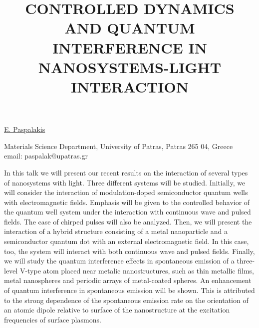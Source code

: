 \title{CONTROLLED DYNAMICS AND QUANTUM INTERFERENCE IN NANOSYSTEMS-LIGHT INTERACTION}

\underline{E. Paspalakis}


Materials Science Department,
University of Patras, Patras 265 04, Greece\\
email: paspalak@upatras.gr

In this talk we will present our recent results on the interaction
of several types of nanosystems with light. Three different
systems will be studied. Initially, we will consider the
interaction of modulation-doped semiconductor quantum wells with
electromagnetic fields. Emphasis will be given to the controlled
behavior of the quantum well system under the interaction with
continuous wave and pulsed fields. The case of chirped pulses
will also be analyzed. Then, we will present the interaction of a
hybrid structure consisting of a metal nanoparticle and a
semiconductor quantum dot with an external electromagnetic field.
In this case, too, the system will interact with both continuous
wave and pulsed fields. Finally, we will study the quantum
interference effects in spontaneous emission of a three-level
V-type atom placed near metalic nanostructures, such as thin
metallic films, metal nanospheres and periodic arrays of
metal-coated spheres. An enhancement of quantum interference in
spontaneous emission will be shown. This is attributed to the
strong dependence of the spontaneous emission rate on the
orientation of an atomic dipole relative to surface of the
nanostructure at the excitation frequencies of surface plasmons.

\vspace{\baselineskip}